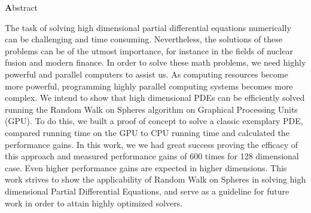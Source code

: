 

\clearemptydoublepage
{}
{}





\vspace*{2cm}
\begin{center}
{\Large \textbf Abstract}
\end{center}
\vspace{1cm}

The task of solving high dimensional partial differential equations numerically
can be challenging and time consuming.  Nevertheless, the solutions of these problems
can be of the utmost importance, for instance in the fields of nuclear fusion and modern finance.
In order to solve these math problems, we need highly powerful and parallel computers
to assist us. As computing resources become more powerful, programming highly
parallel computing systems becomes more complex.  We intend to show that high
dimensional PDEs can be efficiently solved running the Random Walk on Spheres algorithm
on Graphical Processing Units (GPU).  To do this, we built a proof of concept
to solve a classic exemplary PDE, compared running time on the GPU to CPU running time
and calculated the performance gains.  In this work, we we had great success proving the
efficacy of this approach and  measured performance gains of 600 times for 128 dimensional
case.  Even higher performance gains are expected in higher dimensions. This work
strives to show the applicability of Random Walk on Spheres in solving high dimensional Partial
Differential Equations, and serve as a guideline for future work in order to
attain highly optimized solvers.
